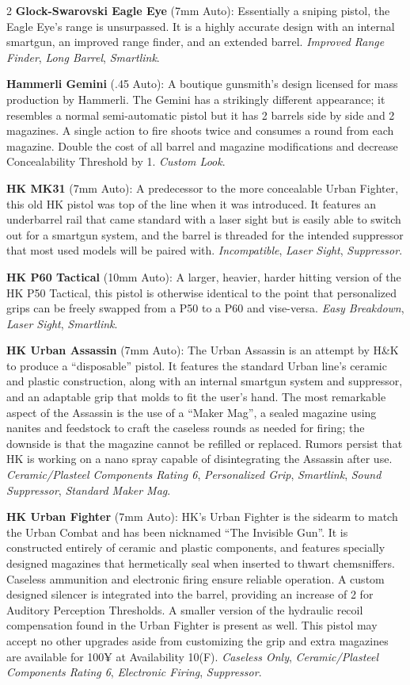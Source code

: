 \documentclass[
  oneside]{article}
\begin{document}
\begin{multicols}{2}
\textbf{Glock-Swarovski Eagle Eye} (7mm Auto):
Essentially a sniping pistol, the Eagle Eye's
range is unsurpassed. It is a highly accurate
design with an internal smartgun, an improved
range finder, and an extended barrel.
\emph{Improved Range Finder}, \emph{Long Barrel},
\emph{Smartlink}.

\textbf{Hammerli Gemini} (.45 Auto): A boutique
gunsmith's design licensed for mass production by
Hammerli. The Gemini has a strikingly different
appearance; it resembles a normal semi-automatic
pistol but it has 2 barrels side by side and 2
magazines. A single action to fire shoots twice
and consumes a round from each magazine. Double
the cost of all barrel and magazine modifications
and decrease Concealability Threshold by 1.
\emph{Custom Look}.

\textbf{HK MK31} (7mm Auto): A predecessor to the
more concealable Urban Fighter, this old HK pistol
was top of the line when it was introduced. It
features an underbarrel rail that came standard
with a laser sight but is easily able to switch
out for a smartgun system, and the barrel is
threaded for the intended suppressor that most
used models will be paired with.
\emph{Incompatible}, \emph{Laser Sight},
\emph{Suppressor}.

\textbf{HK P60 Tactical} (10mm Auto): A larger,
heavier, harder hitting version of the HK P50
Tactical, this pistol is otherwise identical to
the point that personalized grips can be freely
swapped from a P50 to a P60 and vise-versa.
\emph{Easy Breakdown}, \emph{Laser Sight},
\emph{Smartlink}.

\textbf{HK Urban Assassin} (7mm Auto): The Urban
Assassin is an attempt by H\&K to produce a
``disposable'' pistol. It features the standard
Urban line's ceramic and plastic construction,
along with an internal smartgun system and
suppressor, and an adaptable grip that molds to
fit the user's hand. The most remarkable aspect of
the Assassin is the use of a ``Maker Mag'', a
sealed magazine using nanites and feedstock to
craft the caseless rounds as needed for firing;
the downside is that the magazine cannot be
refilled or replaced. Rumors persist that HK is
working on a nano spray capable of disintegrating
the Assassin after use. \emph{Ceramic/Plasteel
Components Rating 6}, \emph{Personalized Grip},
\emph{Smartlink}, \emph{Sound Suppressor},
\emph{Standard Maker Mag}.

\textbf{HK Urban Fighter} (7mm Auto): HK's Urban
Fighter is the sidearm to match the Urban Combat
and has been nicknamed ``The Invisible Gun''. It
is constructed entirely of ceramic and plastic
components, and features specially designed
magazines that hermetically seal when inserted to
thwart chemsniffers. Caseless ammunition and
electronic firing ensure reliable operation. A
custom designed silencer is integrated into the
barrel, providing an increase of 2 for Auditory
Perception Thresholds. A smaller version of the
hydraulic recoil compensation found in the Urban
Fighter is present as well. This pistol may accept
no other upgrades aside from customizing the grip
and extra magazines are available for 100¥ at
Availability 10(F). \emph{Caseless Only},
\emph{Ceramic/Plasteel Components Rating 6},
\emph{Electronic Firing}, \emph{Suppressor}.


\end{multicols}
\end{document}
